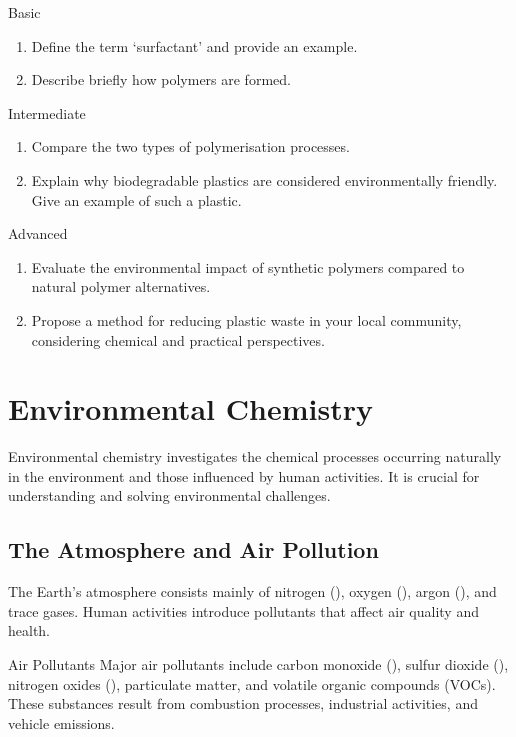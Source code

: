 \begin{tieredquestions}{Basic}
\begin{enumerate}
\item Define the term `surfactant' and provide an example.
\item Describe briefly how polymers are formed.
\end{enumerate}
\end{tieredquestions}

\begin{tieredquestions}{Intermediate}
\begin{enumerate}
\item Compare the two types of polymerisation processes.
\item Explain why biodegradable plastics are considered environmentally friendly. Give an example of such a plastic.
\end{enumerate}
\end{tieredquestions}

\begin{tieredquestions}{Advanced}
\begin{enumerate}
\item Evaluate the environmental impact of synthetic polymers compared to natural polymer alternatives.
\item Propose a method for reducing plastic waste in your local community, considering chemical and practical perspectives.
\end{enumerate}
\end{tieredquestions}

\section{Environmental Chemistry}

Environmental chemistry investigates the chemical processes occurring naturally in the environment and those influenced by human activities. It is crucial for understanding and solving environmental challenges.

\subsection{The Atmosphere and Air Pollution}

The Earth's atmosphere consists mainly of nitrogen (), oxygen (), argon (), and trace gases. Human activities introduce pollutants that affect air quality and health.

\begin{keyconcept}{Air Pollutants}
Major air pollutants include carbon monoxide (), sulfur dioxide (), nitrogen oxides (), particulate matter, and volatile organic compounds (VOCs). These substances result from combustion processes, industrial activities, and vehicle emissions.
\end{keyconcept}

